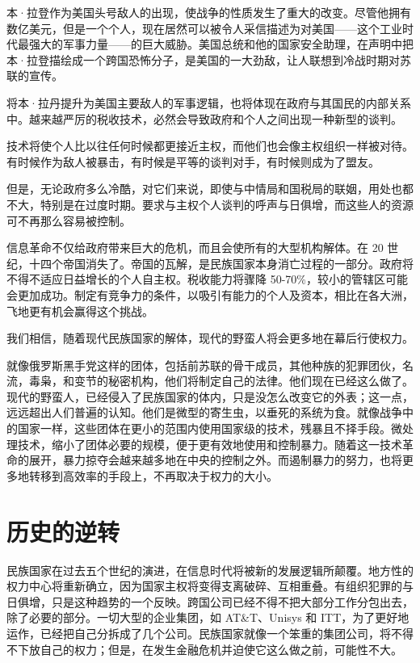 本·拉登作为美国头号敌人的出现，使战争的性质发生了重大的改变。尽管他拥有数亿美元，但是一个个人，现在居然可以被令人采信描述为对美国——这个工业时代最强大的军事力量——的巨大威胁。美国总统和他的国家安全助理，在声明中把本·拉登描绘成一个跨国恐怖分子，是美国的一大劲敌，让人联想到冷战时期对苏联的宣传。


将本·拉丹提升为美国主要敌人的军事逻辑，也将体现在政府与其国民的内部关系中。越来越严厉的税收技术，必然会导致政府和个人之间出现一种新型的谈判。


技术将使个人比以往任何时候都更接近主权，而他们也会像主权组织一样被对待。有时候作为敌人被暴击，有时候是平等的谈判对手，有时候则成为了盟友。


但是，无论政府多么冷酷，对它们来说，即使与中情局和国税局的联姻，用处也都不大，特别是在过度时期。要求与主权个人谈判的呼声与日俱增，而这些人的资源可不再那么容易被控制。


信息革命不仅给政府带来巨大的危机，而且会使所有的大型机构解体。在 20 世纪，十四个帝国消失了。帝国的瓦解，是民族国家本身消亡过程的一部分。政府将不得不适应日益增长的个人自主权。税收能力将骤降 50-70\%，较小的管辖区可能会更加成功。制定有竞争力的条件，以吸引有能力的个人及资本，相比在各大洲，飞地更有机会赢得这个挑战。


我们相信，随着现代民族国家的解体，现代的野蛮人将会更多地在幕后行使权力。


就像俄罗斯黑手党这样的团体，包括前苏联的骨干成员，其他种族的犯罪团伙，名流，毒枭，和变节的秘密机构，他们将制定自己的法律。他们现在已经这么做了。现代的野蛮人，已经侵入了民族国家的体内，只是没怎么改变它的外表；这一点，远远超出人们普遍的认知。他们是微型的寄生虫，以垂死的系统为食。就像战争中的国家一样，这些团体在更小的范围内使用国家级的技术，残暴且不择手段。微处理技术，缩小了团体必要的规模，便于更有效地使用和控制暴力。随着这一技术革命的展开，暴力掠夺会越来越多地在中央的控制之外。而遏制暴力的努力，也将更多地转移到高效率的手段上，不再取决于权力的大小。



\section{历史的逆转}

民族国家在过去五个世纪的演进，在信息时代将被新的发展逻辑所颠覆。地方性的权力中心将重新确立，因为国家主权将变得支离破碎、互相重叠。有组织犯罪的与日俱增，只是这种趋势的一个反映。跨国公司已经不得不把大部分工作分包出去，除了必要的部分。一切大型的企业集团，如 AT\&T、Unisys 和 ITT，为了更好地运作，已经把自己分拆成了几个公司。民族国家就像一个笨重的集团公司，将不得不下放自己的权力；但是，在发生金融危机并迫使它这么做之前，可能性不大。


